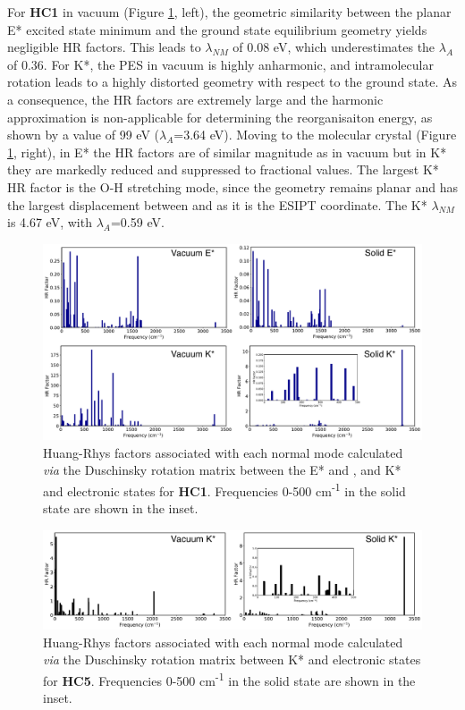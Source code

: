 For \textbf{HC1} in vacuum (Figure \ref{figure: HC1_DUSHIN}, left), the geometric similarity between the planar E* excited state minimum and the ground state equilibrium geometry yields negligible HR factors. This leads to $\lambda_{NM}$ of 0.08 eV, which underestimates the $\lambda_{A}$ of 0.36. For K*, the PES in vacuum is highly anharmonic, and intramolecular rotation leads to a highly distorted geometry with respect to the ground state. As a consequence, the HR factors are extremely large and the harmonic approximation is non-applicable for determining the reorganisaiton energy, as shown by a value of 99 eV ($\lambda_{A}$=3.64 eV). Moving to the molecular crystal (Figure \ref{figure: HC1_DUSHIN}, right), in E* the HR factors are of similar magnitude as in vacuum but in K* they are markedly reduced and suppressed to fractional values. The largest K* HR factor is the O-H stretching mode, since the geometry remains planar and has the largest displacement between \szero{} and \sone{} as it is the ESIPT coordinate. The K* $\lambda_{NM}$ is 4.67 eV, with $\lambda_{A}$=0.59 eV. 

\begin{figure}[t]
\centering
  \includegraphics[width=\linewidth]{5ConnectingCrystalStructure/HC1_DUSHIN}
  \caption{Huang-Rhys factors associated with each normal mode calculated \textit{via} the Duschinsky rotation matrix between the E* and \szero{}, and K* and \szero{} electronic states for \textbf{HC1}. Frequencies 0-500 cm\textsuperscript{-1} in the solid state are shown in the inset.}
  \label{figure: HC1_DUSHIN}
\end{figure}

\begin{figure}[H]
\centering
  \includegraphics[width=\linewidth]{5ConnectingCrystalStructure/HC5_DUSHIN}
  \caption{Huang-Rhys factors associated with each normal mode calculated \textit{via} the Duschinsky rotation matrix between  K* and \szero{} electronic states for \textbf{HC5}. Frequencies 0-500 cm\textsuperscript{-1} in the solid state are shown in the inset.}
  \label{figure: HC5_DUSHIN}
\end{figure}

